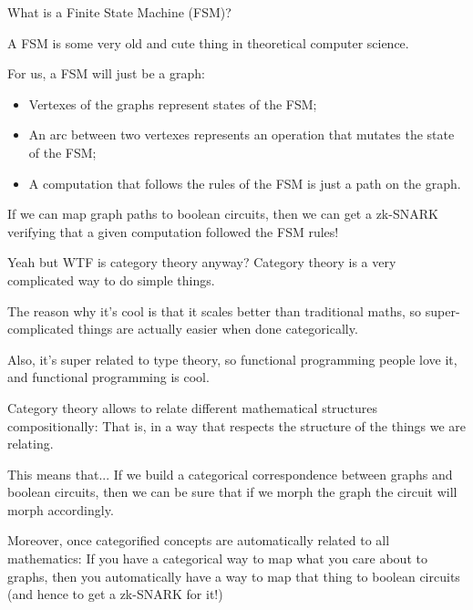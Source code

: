\documentclass[xcolor={dvipsnames}]{beamer}
\begin{document}
%
%
\begin{frame}{What is a Finite State Machine (FSM)?}
  \pause
  \begin{center}
  \end{center}
  A FSM is some very old and cute thing in theoretical computer science.\pause

  \medskip
  For us, a FSM will just be a graph:
    \pause
  \begin{itemize}
    \item Vertexes of the graphs represent states of the FSM;
      \pause
    \item An arc between two vertexes represents an operation that mutates the state of the FSM;
      \pause
    \item A computation that follows the rules of the FSM is just a path on the graph.
      \pause
  \end{itemize}
  If we can map graph paths to boolean circuits, then we can get a zk-SNARK verifying
  that a given computation followed the FSM rules!
\end{frame}
%
%
\begin{frame}{Yeah but WTF is category theory anyway?}
  \pause
  Category theory is a very complicated way to do simple things.
    \pause

  \bigskip
  The reason why it's cool is that it scales better than traditional maths, so 
  super-complicated things are actually easier when done categorically.
    \pause
  
  \bigskip
  Also, it's super related to type theory, so functional programming people love it, and functional programming is cool.
    \pause
  
  \bigskip
  Category theory allows to relate different mathematical structures compositionally:
  That is, in a way that respects the structure of the things we are relating.
\end{frame}
%
%
\begin{frame}{This means that...}
  \pause
  If we build a categorical correspondence between graphs and boolean circuits,
  then we can be sure that if we morph the graph the circuit will morph accordingly.\pause

  \bigskip
  Moreover, once categorified concepts are automatically related to all mathematics:
  If you have a categorical way to map what you care about to graphs, then you automatically
  have a way to map that thing to boolean circuits (and hence to get a zk-SNARK for it!)
\end{frame}
\end{document}
